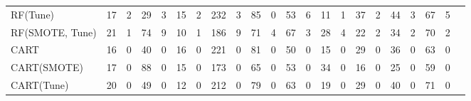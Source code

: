 \documentclass[compsoc, onecolumn]{IEEEtran}
\begin{document}
\begin{table*}[h]
{\begin{tabular}{l@{}|l@{~}l@{~}|l@{~}l@{~}|l@{~}l@{~}|l@{~}l@{~}|l@{~}l@{~}|l@{~}l@{~}|l@{~}l@{~}|l@{~}l@{~}|l@{~}l@{~}|l@{~}l@{~}l@{}}
RF(Tune)          & 17                     & 2                     & 29                     & 3                     & 15                     & 2                     & 232                     & 3                    & 85                        & 0                        & 53                       & 6                       & 11                        & 1                       & 37                       & 2                        & 44                     & 3                    & 67                    & 5                     \\
RF(SMOTE, Tune)   & 21                   & 1                     & 74                   & 9                     & 10                   & 1                     & 186                   & 9                    & 71                      & 4                        & 67                     & 3                       & 28                      & 4                       & 22                       & 2                        & 34                   & 2                    & 70                    & 2                     \\
CART              & 16                     & 0                     & 40                     & 0                     & 16                     & 0                     & 221                     & 0                    & 81                        & 0                        & 50                       & 0                       & 15                        & 0                       & 29                         & 0                        & 36                     & 0                    & 63                    & 0                     \\
CART(SMOTE)       & 17                     & 0                     & 88                     & 0                     & 15                     & 0                     & 173                     & 0                    & 65                        & 0                        & 53                       & 0                       & 34                        & 0                       & 16                         & 0                        & 25                     & 0                    & 59                    & 0                     \\
CART(Tune)        & 20                     & 0                     & 49                     & 0                     & 12                     & 0                     & 212                     & 0                    & 79                        & 0                        & 63                       & 0                       & 19                        & 0                       & 29                         & 0                        & 40                     & 0                    & 71                    & 0                     \\

\end{tabular}}
\end{table*}
\end{document}
